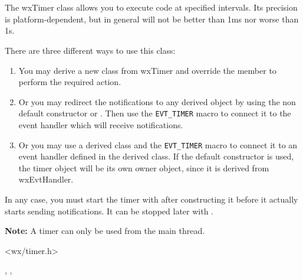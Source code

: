 \section{}\label{wxtimer}

The wxTimer class allows you to execute code at specified intervals. Its
precision is platform-dependent, but in general will not be better than 1ms nor
worse than 1s.

There are three different ways to use this class:

\begin{enumerate}
\item You may derive a new class from wxTimer and override the 
 member to perform the required action.
\item Or you may redirect the notifications to any 
 derived object by using the non default
constructor or . Then use the {\tt EVT\_TIMER} 
macro to connect it to the event handler which will receive 
 notifications.
\item Or you may use a derived class and the {\tt EVT\_TIMER} 
macro to connect it to an event handler defined in the derived class.
If the default constructor is used, the timer object will be its
own owner object, since it is derived from wxEvtHandler.
\end{enumerate}

In any case, you must start the timer with  
after constructing it before it actually starts sending notifications. It can
be stopped later with .

{\bf Note:} A timer can only be used from the main thread.




<wx/timer.h>


, , 


\label{wxtimerwxtimer}


